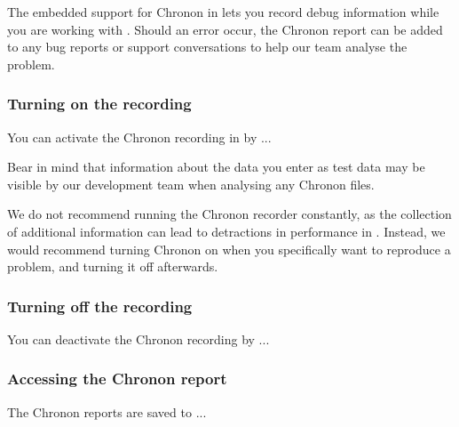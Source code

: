 The embedded support for Chronon in \app{} lets you record debug information while you are working with \app{}. Should an error occur, the Chronon report can be added to any bug reports or support conversations to help our team analyse the problem. 

\subsubsection{Turning on the recording}
You can activate the Chronon recording in \app{} by ...

Bear in mind that information about the data you enter as test data may be visible by our development team when analysing any Chronon files. 

We do not recommend running the Chronon recorder constantly, as the collection of additional information can lead to detractions in performance in \app{}. Instead, we would recommend turning Chronon on when you specifically want to reproduce a problem, and turning it off afterwards. 
 
\subsubsection{Turning off the recording}
You can deactivate the Chronon recording by ...

\subsubsection{Accessing the Chronon report}
The Chronon reports are saved to ... 

